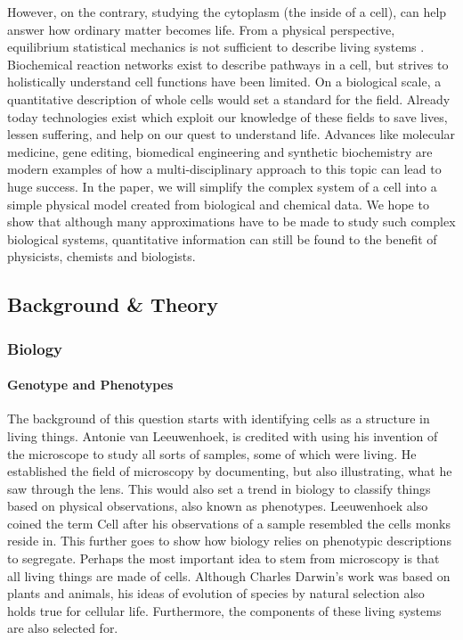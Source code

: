 \documentclass{article}
\begin{document}
However, on the contrary, studying the cytoplasm (the inside of a cell), can help answer how ordinary matter becomes life. From a physical perspective, equilibrium statistical mechanics is not sufficient to describe living systems . Biochemical reaction networks exist to describe pathways in a cell, but strives to holistically understand cell functions have been limited. On a biological scale, a quantitative description of whole cells would set a standard for the field. Already today technologies exist which exploit our knowledge of these fields to save lives, lessen suffering, and help on our quest to understand life. Advances like molecular medicine, gene editing, biomedical engineering and synthetic biochemistry are modern examples of how a multi-disciplinary approach to this topic can lead to huge success. In the paper, we will simplify the complex system of a cell into a simple physical model created from biological and chemical data. We hope to show that although many approximations have to be made to study such complex biological systems, quantitative information can still be found to the benefit of physicists, chemists and biologists.

\subsection{Background \& Theory}

\subsubsection{Biology}

\paragraph{Genotype and Phenotypes}

The background of this question starts with identifying cells as a structure in living things. Antonie van Leeuwenhoek, is credited with using his invention of the microscope to study all sorts of samples, some of which were living. He established the field of microscopy by documenting, but also illustrating, what he saw through the lens. This would also set a trend in biology to classify things based on physical observations, also known as phenotypes. Leeuwenhoek also coined the term Cell after his observations of a sample resembled the cells monks reside in. This further goes to show how biology relies on phenotypic descriptions to segregate. Perhaps the most important idea to stem from microscopy is that all living things are made of cells. Although Charles Darwin's work was based on plants and animals, his ideas of evolution of species by natural selection also holds true for cellular life. Furthermore, the components of these living systems are also selected for.
\end{document}
